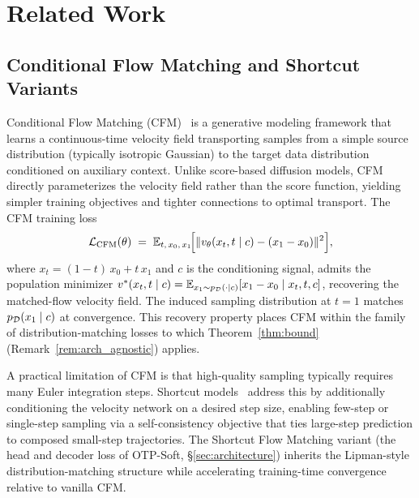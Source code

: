 
\section{Related Work}
\label{sec:related_work}

\subsection{Conditional Flow Matching and Shortcut Variants}
\label{sec:related:cfm}

Conditional Flow Matching (CFM)~\cite{lipman2023flow_matching, liu2022rectified} is a
generative modeling framework that learns a continuous-time velocity field transporting
samples from a simple source distribution (typically isotropic Gaussian) to the target
data distribution conditioned on auxiliary context. Unlike score-based diffusion models,
CFM directly parameterizes the velocity field rather than the score function, yielding
simpler training objectives and tighter connections to optimal transport. The CFM training
loss
\begin{equation}
\mathcal{L}_{\text{CFM}}(\theta) \;=\; \mathbb{E}_{t,\,x_0,\,x_1}\!\Bigl[\| v_\theta(x_t, t \mid c) - (x_1 - x_0) \|^2\Bigr],
\label{eq:cfm_loss}
\end{equation}
where $x_t = (1-t)\, x_0 + t\, x_1$ and $c$ is the conditioning signal, admits the
population minimizer $v^*(x_t, t \mid c) = \mathbb{E}_{x_1 \sim p_{\mathcal{D}}(\cdot \mid c)}[x_1
- x_0 \mid x_t, t, c]$, recovering the matched-flow velocity field. The induced sampling
distribution at $t = 1$ matches $p_{\mathcal{D}}(x_1 \mid c)$ at convergence. This recovery property
places CFM within the family of distribution-matching losses to which Theorem~\ref{thm:bound}
(Remark~\ref{rem:arch_agnostic}) applies.

A practical limitation of CFM is that high-quality sampling typically requires many Euler
integration steps. Shortcut models~\cite{frans2024shortcut} address this by additionally
conditioning the velocity network on a desired step size, enabling few-step or single-step
sampling via a self-consistency objective that ties large-step prediction to composed
small-step trajectories. The Shortcut Flow Matching variant (the head and decoder loss of
OTP-Soft, \S\ref{sec:architecture}) inherits the Lipman-style distribution-matching
structure while accelerating training-time convergence relative to vanilla CFM.

